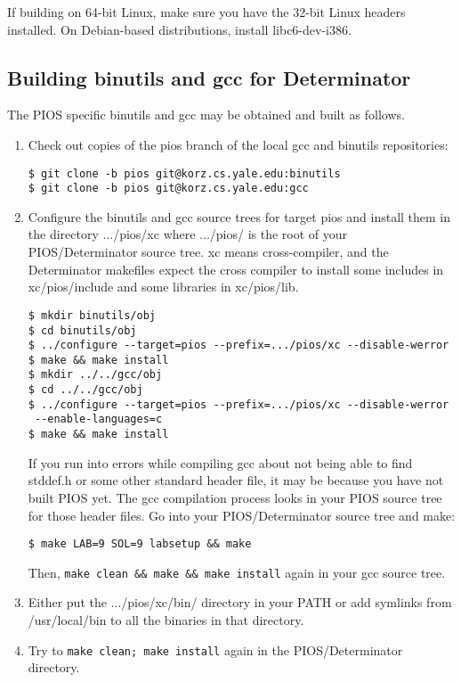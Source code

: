 If building on 64-bit Linux, make sure you have the 32-bit Linux headers installed. On Debian-based distributions, install libc6-dev-i386.

\subsection{Building binutils and gcc for Determinator}
The PIOS specific binutils and gcc may be obtained and built as follows.
\begin{enumerate}
\item Check out copies of the pios branch of the local gcc and binutils repositories:

\begin{verbatim}
$ git clone -b pios git@korz.cs.yale.edu:binutils
$ git clone -b pios git@korz.cs.yale.edu:gcc
\end{verbatim}

\item Configure the binutils and gcc source trees for target pios and install them in the directory .../pios/xc where .../pios/ is the root of your PIOS/Determinator source tree. xc means cross-compiler, and the Determinator makefiles expect the cross compiler to install some includes in xc/pios/include and some libraries in xc/pios/lib.

\begin{verbatim}
$ mkdir binutils/obj
$ cd binutils/obj
$ ../configure --target=pios --prefix=.../pios/xc --disable-werror
$ make && make install
$ mkdir ../../gcc/obj
$ cd ../../gcc/obj
$ ../configure --target=pios --prefix=.../pios/xc --disable-werror
 --enable-languages=c
$ make && make install
\end{verbatim}

If you run into errors while compiling gcc about not being able to find stddef.h or some other standard header file, it may be because you have not built PIOS yet. The gcc compilation process looks in your PIOS source tree for those header files. Go into your PIOS/Determinator source tree and make:

\verb|$ make LAB=9 SOL=9 labsetup && make|

Then, \verb|make clean && make && make install| again in your gcc source tree.

\item Either put the .../pios/xc/bin/ directory in your PATH or add symlinks from /usr/local/bin to all the binaries in that directory.

\item Try to \verb|make clean; make install| again in the PIOS/Determinator directory.
\end{enumerate}

